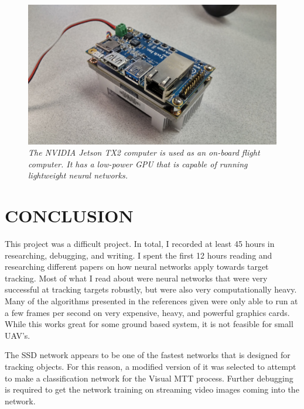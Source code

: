 \documentclass[letterpaper, 10 pt, conference]{ieeeconf}  %
\begin{document}
\begin{figure}
	\begin{center}
		\includegraphics[width=.45\textwidth]{tx2.jpg}
		\caption{\textit{The NVIDIA Jetson TX2 computer is used as an on-board flight computer. It has a low-power GPU that is capable of running lightweight neural networks.}} 
		\label{fig:tx2}
	\end{center}
\end{figure}


\section{CONCLUSION} \label{CONCLUSION}

This project was a difficult project. In total, I recorded at least 45 hours in researching, debugging, and writing. I spent the first 12 hours reading and researching different papers on how neural networks apply towards target tracking. Most of what I read about were neural networks that were very successful at tracking targets robustly, but were also very computationally heavy. Many of the algorithms presented in the references given were only able to run at a few frames per second on very expensive, heavy, and powerful graphics cards. While this works great for some ground based system, it is not feasible for small UAV's.

The SSD network appears to be one of the fastest networks that is designed for tracking objects. For this reason, a modified version of it was selected to attempt to make a classification network for the Visual MTT process. Further debugging is required to get the network training on streaming video images coming into the network. 
\end{document}
